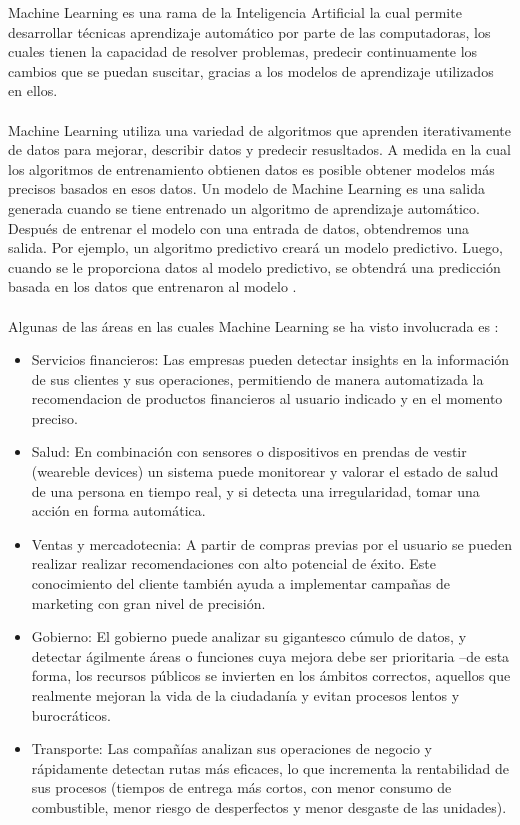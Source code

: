 Machine Learning es una rama de la Inteligencia Artificial la cual permite  desarrollar técnicas aprendizaje 
automático por parte de las computadoras, los cuales tienen la capacidad de resolver problemas, predecir 
continuamente los cambios que se puedan suscitar, gracias a los modelos de aprendizaje utilizados en ellos.
\\\\
Machine Learning utiliza una variedad de algoritmos que aprenden iterativamente de datos para mejorar, describir 
datos y predecir resusltados. A medida en la cual los algoritmos de entrenamiento obtienen datos es posible obtener 
modelos más precisos basados en esos datos. Un modelo de Machine Learning es una salida generada cuando se tiene 
entrenado un algoritmo de aprendizaje automático. Después de entrenar el modelo con una entrada de datos, obtendremos 
una salida. Por ejemplo, un algoritmo predictivo creará un modelo predictivo. Luego, cuando se le proporciona datos 
al modelo predictivo, se obtendrá una predicción basada en los datos que entrenaron al modelo \citep{CT2}.
\\
\\
Algunas de las áreas en las cuales Machine Learning se ha visto involucrada es \citep{CT3}:
\begin{itemize}
	\item Servicios financieros: Las empresas pueden detectar insights en la información de sus clientes 
	y sus operaciones, permitiendo de manera automatizada la recomendacion de productos financieros al usuario 
	indicado y en el momento preciso.
	\item Salud: En combinación con sensores o dispositivos en prendas de vestir (weareble devices) 
	un sistema puede monitorear y valorar el estado de salud de una persona en tiempo real, y si detecta 
	una irregularidad, tomar una acción en forma automática.
	\item Ventas y mercadotecnia: A partir de compras previas por el usuario se pueden realizar 
	realizar recomendaciones con alto potencial de éxito. Este conocimiento del cliente también ayuda a implementar 
	campañas de marketing con gran nivel de precisión.
	\item Gobierno:  El gobierno puede analizar su gigantesco cúmulo de datos, y detectar ágilmente áreas o
	funciones cuya mejora debe ser prioritaria –de esta forma, los recursos	públicos se invierten en los ámbitos 
	correctos, aquellos que realmente mejoran la vida de la ciudadanía y evitan procesos lentos y burocráticos.
	\item Transporte: Las compañías analizan sus operaciones de negocio y rápidamente detectan rutas más
	eficaces, lo que incrementa la rentabilidad de sus procesos (tiempos de entrega más cortos, con menor consumo 
	de combustible, menor riesgo de desperfectos y menor desgaste de las unidades).
\end{itemize}

